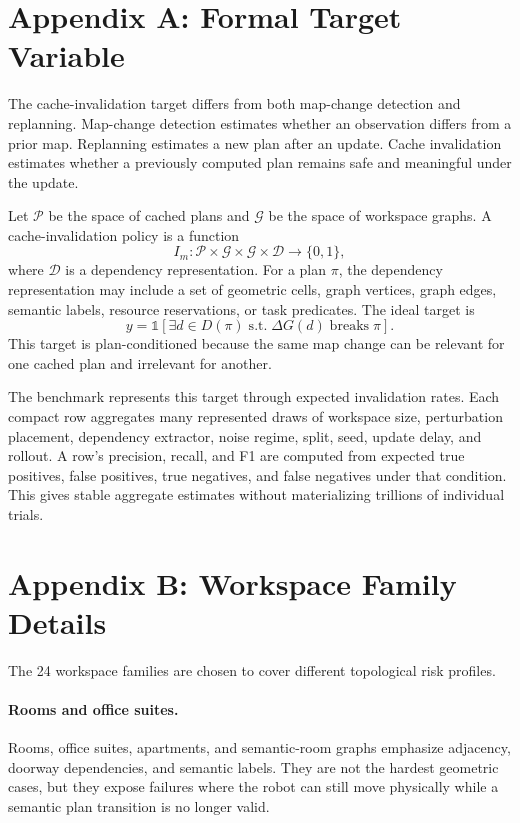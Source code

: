\documentclass{article}
\begin{document}
\appendix

\section{Appendix A: Formal Target Variable}

The cache-invalidation target differs from both map-change detection and replanning. Map-change detection estimates whether an observation differs from a prior map. Replanning estimates a new plan after an update. Cache invalidation estimates whether a previously computed plan remains safe and meaningful under the update.

Let $\mathcal{P}$ be the space of cached plans and $\mathcal{G}$ be the space of workspace graphs. A cache-invalidation policy is a function
\[
    I_m : \mathcal{P} \times \mathcal{G} \times \mathcal{G} \times \mathcal{D} \rightarrow \{0,1\},
\]
where $\mathcal{D}$ is a dependency representation. For a plan $\pi$, the dependency representation may include a set of geometric cells, graph vertices, graph edges, semantic labels, resource reservations, or task predicates. The ideal target is
\[
    y = \mathbb{1}\left[\exists d \in D(\pi) \; \mathrm{s.t.} \; \Delta G(d) \;\mathrm{breaks}\; \pi \right].
\]
This target is plan-conditioned because the same map change can be relevant for one cached plan and irrelevant for another.

The benchmark represents this target through expected invalidation rates. Each compact row aggregates many represented draws of workspace size, perturbation placement, dependency extractor, noise regime, split, seed, update delay, and rollout. A row's precision, recall, and F1 are computed from expected true positives, false positives, true negatives, and false negatives under that condition. This gives stable aggregate estimates without materializing trillions of individual trials.

\section{Appendix B: Workspace Family Details}

The 24 workspace families are chosen to cover different topological risk profiles.

\paragraph{Rooms and office suites.}
Rooms, office suites, apartments, and semantic-room graphs emphasize adjacency, doorway dependencies, and semantic labels. They are not the hardest geometric cases, but they expose failures where the robot can still move physically while a semantic plan transition is no longer valid.
\end{document}
